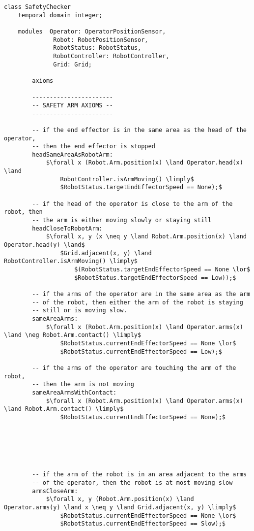 \begin{lstlisting}[fontadjust, mathescape, frame=single] 
class SafetyChecker
    temporal domain integer;

    modules  Operator: OperatorPositionSensor,
              Robot: RobotPositionSensor,
              RobotStatus: RobotStatus,
              RobotController: RobotController,
              Grid: Grid;
    
        axioms
    
        -----------------------
        -- SAFETY ARM AXIOMS --
        -----------------------
        
        -- if the end effector is in the same area as the head of the operator,
        -- then the end effector is stopped
        headSameAreaAsRobotArm:
            $\forall x (Robot.Arm.position(x) \land Operator.head(x) \land
                RobotController.isArmMoving() \limply$
                $RobotStatus.targetEndEffectorSpeed == None);$

        -- if the head of the operator is close to the arm of the robot, then
        -- the arm is either moving slowly or staying still
        headCloseToRobotArm:
            $\forall x, y (x \neq y \land Robot.Arm.position(x) \land Operator.head(y) \land$
                $Grid.adjacent(x, y) \land RobotController.isArmMoving() \limply$
                    $(RobotStatus.targetEndEffectorSpeed == None \lor$
                    $RobotStatus.targetEndEffectorSpeed == Low));$

        -- if the arms of the operator are in the same area as the arm
        -- of the robot, then either the arm of the robot is staying
        -- still or is moving slow.
        sameAreaArms:
            $\forall x (Robot.Arm.position(x) \land Operator.arms(x) \land \neg Robot.Arm.contact() \limply$
                $RobotStatus.currentEndEffectorSpeed == None \lor$
                $RobotStatus.currentEndEffectorSpeed == Low);$

        -- if the arms of the operator are touching the arm of the robot,
        -- then the arm is not moving
        sameAreaArmsWithContact:
            $\forall x (Robot.Arm.position(x) \land Operator.arms(x) \land Robot.Arm.contact() \limply$
                $RobotStatus.currentEndEffectorSpeed == None);$






        -- if the arm of the robot is in an area adjacent to the arms
        -- of the operator, then the robot is at most moving slow
        armsCloseArm:
            $\forall x, y (Robot.Arm.position(x) \land Operator.arms(y) \land x \neq y \land Grid.adjacent(x, y) \limply$
                $RobotStatus.currentEndEffectorSpeed == None \lor$
                $RobotStatus.currentEndEffectorSpeed == Slow);$


\end{lstlisting}
